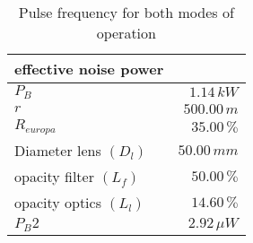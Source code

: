 \begin{table}[H]
\centering
\caption{Pulse frequency for both modes of operation}
\label{tab:effective_noise_power}
\begin{tabular}{|l|r|}\hline
    \textbf{effective noise power} & \\
    \hline 
    $P_B$ & $1.14\,k W$ \\
    $r$ & $500.00\, m$ \\
    $R_{europa}$ & $35.00\, \%$ \\
    Diameter lens $(D_l)$ & $50.00\,m m$ \\
    opacity filter $(L_f)$ & $50.00\, \%$ \\
    opacity optics $(L_l)$ & $14.60\, \%$ \\
    $P_B2$ & $2.92\,\mu W$ \\
    \hline 
\end{tabular}
\end{table}

